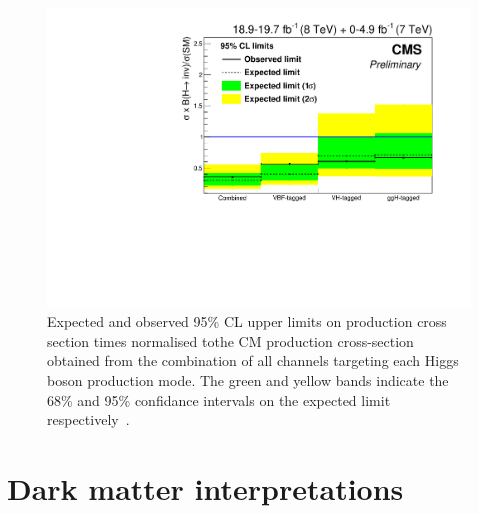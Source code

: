\begin{figure}
  \includegraphics[width=\largefigwidth]{plots/comb/HIG-15-012-figs/channellimit.pdf}
  \caption{Expected and observed 95\% \ac{CL} upper limits on production cross section times \BRinv normalised tothe \ac{CM} production cross-section obtained from the combination of all channels targeting each Higgs boson production mode. The green and yellow bands indicate the 68\% and 95\% confidance intervals on the expected limit respectively~\cite{CMS-PAS-HIG-15-012}.}
  \label{fig:parkedcombchannel}
\end{figure}




\section{Dark matter interpretations}
\label{sec:dminterp}
